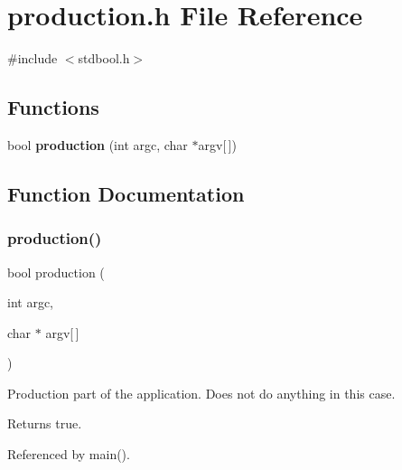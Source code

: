 \section{production.\+h File Reference}
\label{production_8h}
{\ttfamily \#include $<$stdbool.\+h$>$}\newline
\subsection*{Functions}
\begin{DoxyCompactItemize}
\item 
bool \textbf{ production} (int argc, char $\ast$argv[$\,$])
\end{DoxyCompactItemize}


\subsection{Function Documentation}
\mbox{\label{production_8h_a9f67b51c42a54745557e7a2c9c07c46f}} 
\subsubsection{production()}
{\footnotesize\ttfamily bool production (\begin{DoxyParamCaption}\item[{int}]{argc,  }\item[{char $\ast$}]{argv[$\,$] }\end{DoxyParamCaption})}

Production part of the application. Does not do anything in this case. \begin{DoxyReturn}{Returns}
true. 
\end{DoxyReturn}


Referenced by main().

